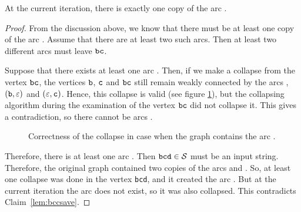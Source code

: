 \begin{lemma}
\label{lem:bbcone}
At the current iteration, there is exactly one copy of the arc .
\end{lemma}
\begin{proof}
From the discussion above, we know that there must be at least one copy of the arc . Assume that there are at least two such arcs. Then at least two different arcs must leave $ {\tt bc} $.

Suppose that there exists at least one arc . Then, if we make a collapse from the vertex $ {\tt bc} $, the vertices $ {\tt b} $, $ {\tt c} $ and $ {\tt bc} $ still remain weakly connected by the arcs , $ ({\tt b}, \varepsilon) $ and $ (\varepsilon, {\tt c}) $. Hence, this collapse is valid (see figure \ref{fig:lvl1lemmabcc}), but the collapsing algorithm during the examination of the vertex $ {\tt bc} $ did not collapse it. This gives a contradiction, so there cannot be arcs .

\begin{figure}[ht]
\begin{center}

\end{center}

\caption{Correctness of the collapse in case when the graph contains the arc .}\label{fig:lvl1lemmabcc}
\end{figure}

Therefore, there is at least one arc . Then $ {\tt bcd} \in {\cal S} $ must be an input string. Therefore, the original graph contained two copies of the arcs  and . So, at least one collapse was done in the vertex {\tt bcd}, and it created the arc . But at the current iteration the arc  does not exist, so it was also collapsed. This contradicts Claim~\ref{lem:bccsave}.
\end{proof}

